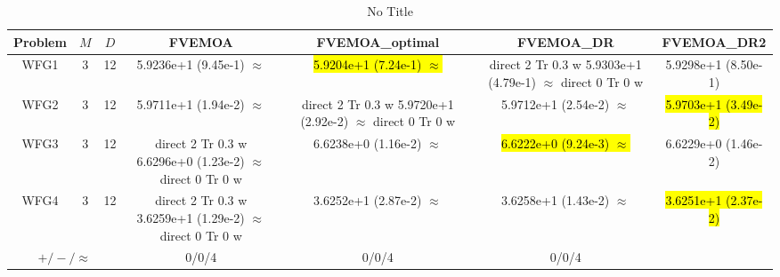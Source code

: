 \documentclass[journal]{IEEEtran}
\newcommand{\semitextbf}[1]{%
\pdfliteral direct {2 Tr 0.3 w} %
#1%
\pdfliteral direct {0 Tr 0 w}%
}
\begin{document}
\begin{table*}[htbp]
\renewcommand{\arraystretch}{1.2}
\centering
\caption{No Title}
\begin{tabular}{ccccccc}
\toprule
Problem&$M$&$D$&FVEMOA&FVEMOA\_optimal&FVEMOA\_DR&FVEMOA\_DR2\\
\midrule
\multirow{1}{*}{WFG1}&3&12&5.9236e+1 (9.45e-1) $\approx$&\hl{5.9204e+1 (7.24e-1) $\approx$}&\semitextbf{5.9303e+1 (4.79e-1) $\approx$}&5.9298e+1 (8.50e-1)\\
\hline
\multirow{1}{*}{WFG2}&3&12&5.9711e+1 (1.94e-2) $\approx$&\semitextbf{5.9720e+1 (2.92e-2) $\approx$}&5.9712e+1 (2.54e-2) $\approx$&\hl{5.9703e+1 (3.49e-2)}\\
\hline
\multirow{1}{*}{WFG3}&3&12&\semitextbf{6.6296e+0 (1.23e-2) $\approx$}&6.6238e+0 (1.16e-2) $\approx$&\hl{6.6222e+0 (9.24e-3) $\approx$}&6.6229e+0 (1.46e-2)\\
\hline
\multirow{1}{*}{WFG4}&3&12&\semitextbf{3.6259e+1 (1.29e-2) $\approx$}&3.6252e+1 (2.87e-2) $\approx$&3.6258e+1 (1.43e-2) $\approx$&\hl{3.6251e+1 (2.37e-2)}\\
\hline
\multicolumn{3}{c}{$+/-/\approx$}&0/0/4&0/0/4&0/0/4&\\
\bottomrule
\end{tabular}
\label{No Label}
\end{table*}
\end{document}
